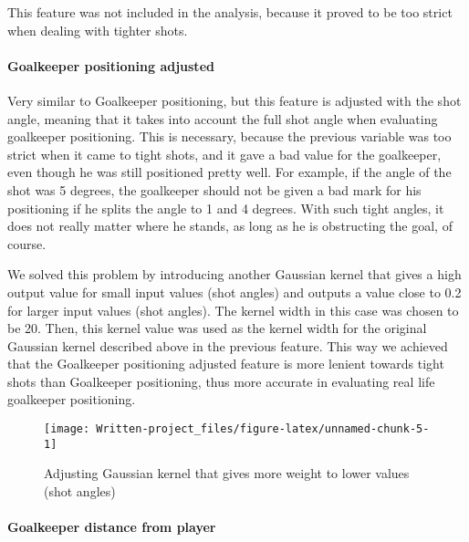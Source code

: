 \documentclass[]{article}
\let\oldparagraph\paragraph
\renewcommand{\paragraph}[1]{\oldparagraph{#1}\mbox{}}
\begin{document}
This feature was not included in the analysis, because it proved to be
too strict when dealing with tighter shots.

\hypertarget{goalkeeper-positioning-adjusted}{%
\paragraph{Goalkeeper positioning
adjusted}\label{goalkeeper-positioning-adjusted}}

Very similar to Goalkeeper positioning, but this feature is adjusted
with the shot angle, meaning that it takes into account the full shot
angle when evaluating goalkeeper positioning. This is necessary, because
the previous variable was too strict when it came to tight shots, and it
gave a bad value for the goalkeeper, even though he was still positioned
pretty well. For example, if the angle of the shot was 5 degrees, the
goalkeeper should not be given a bad mark for his positioning if he
splits the angle to 1 and 4 degrees. With such tight angles, it does not
really matter where he stands, as long as he is obstructing the goal, of
course.

We solved this problem by introducing another Gaussian kernel that gives
a high output value for small input values (shot angles) and outputs a
value close to 0.2 for larger input values (shot angles). The kernel
width in this case was chosen to be 20. Then, this kernel value was used
as the kernel width for the original Gaussian kernel described above in
the previous feature. This way we achieved that the Goalkeeper
positioning adjusted feature is more lenient towards tight shots than
Goalkeeper positioning, thus more accurate in evaluating real life
goalkeeper positioning.

\begin{figure}[!h]

{\centering \texttt{[image: Written-project\_files/figure-latex/unnamed-chunk-5-1]} 

}

\caption{\label{fig:gauss_kernel_adjust} Adjusting Gaussian kernel that gives more weight to lower values (shot angles)}\label{fig:unnamed-chunk-5}
\end{figure}

\hypertarget{goalkeeper-distance-from-player}{%
\paragraph{Goalkeeper distance from
player}\label{goalkeeper-distance-from-player}}
\end{document}
